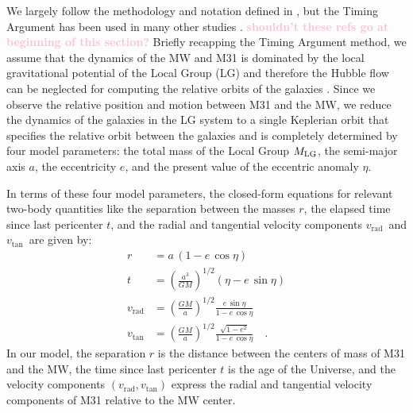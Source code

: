 \documentclass[twocolumn]{aastex631}
\newcommand{\kc}[1]{\textcolor{pink}{\textbf{#1}} }
\newcommand{\mlg}{\ensuremath{M_{\rm LG}}}
\newcommand{\vtan}{\ensuremath{v_\textrm{tan}}}
\newcommand{\vrad}{\ensuremath{v_\textrm{rad}}}
\begin{document}
We largely follow the methodology and notation defined in
\citet{Penarrubia2016}, but the Timing Argument has been used in many other
studies \citep[e.g.,][]{Kahn1959, Kroeker1991,LiWhite2008,more} .
\kc{shouldn't these refs go at beginning of this section?}
Briefly recapping the Timing Argument method, we assume that the dynamics of the
MW and M31 is dominated by the local gravitational potential of the Local Group
(LG) and therefore the Hubble flow can be neglected for computing the relative
orbits of the galaxies \citep[see, e.g.,][]{Penarrubia2014}.
Since we observe the relative position and motion between M31 and the MW, we
reduce the dynamics of the galaxies in the LG system to a single Keplerian orbit
that specifies the relative orbit between the galaxies and is completely
determined by four model parameters: the total mass of the Local Group \mlg, the
semi-major axis $a$, the eccentricity $e$, and the present value of the
eccentric anomaly $\eta$.

In terms of these four model parameters, the closed-form equations for relevant
two-body quantities like the separation between the masses $r$, the elapsed time
since last pericenter $t$, and the radial and tangential velocity components
\vrad\ and \vtan\ are given by:
\begin{align}
  r &= a \, (1-e\,\cos\eta) \label{eq:r} \\
  t &= \left( \frac{a^3}{GM} \right)^{1/2}(\eta-e\,\sin\eta) \label{eq:t} \\
  \vrad &= \left( \frac{GM}{a} \right)^{1/2} \frac{e\,\sin\eta}{1-e\,\cos\eta} \label{eq:vrad} \\
  \vtan &= \left( \frac{GM}{a} \right)^{1/2} \frac{\sqrt{1-e^2}}{1-e\,\cos\eta} \label{eq:vtan} \quad .
\end{align}
In our model, the separation $r$ is the distance between the centers of mass of
M31 and the MW, the time since last pericenter $t$ is the age of the Universe,
and the velocity components $(\vrad, \vtan)$ express the radial and tangential
velocity components of M31 relative to the MW center.
\end{document}
